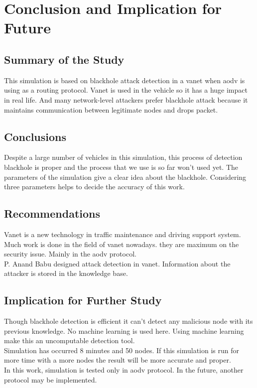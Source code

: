 
\chapter{Conclusion and Implication for Future} %

\label{Chapter5} %


\section{Summary of the Study}

This simulation is based on blackhole attack detection in a vanet when aodv is using as a routing protocol. Vanet is used in the vehicle so it has a huge impact in real life. And many network-level attackers prefer blackhole attack because it maintains communication between legitimate nodes and drops packet. 

\section{Conclusions}

Despite a large number of vehicles in this simulation, this process of detection blackhole is proper and the process that we use is so far won't used yet. The parameters of the simulation give a clear idea about the blackhole. Considering three parameters helps to decide the accuracy of this work. 

\section{Recommendations}
Vanet is a new technology in traffic maintenance and driving support system. Much work is done in the field of vanet nowadays. they are maximum on the security issue. Mainly in the aodv protocol.\\
P. Anand Babu designed attack detection in vanet. Information about the attacker is stored in the knowledge base. 


\section{Implication for Further Study}

Though blackhole detection is efficient it can't detect any malicious node with its previous knowledge. No machine learning is used here. Using machine learning make this an uncomputable detection tool.\\
Simulation has occurred 8 minutes and 50 nodes. If this simulation is run for more time with a more nodes the result will be more accurate and proper.\\
In this work, simulation is tested only in aodv protocol. In the future, another protocol may be implemented.
